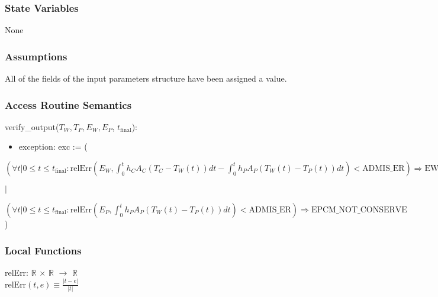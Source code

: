 \documentclass[12pt, titlepage]{article}
\begin{document}
\subsubsection{State Variables}

None

\subsubsection{Assumptions}

All of the fields of the input parameters structure have been assigned a
value.  

\subsubsection{Access Routine Semantics}

\noindent verify\_output($T_W, T_P, E_W, E_P$, $t_\text{final}$):
\begin{itemize}
\item exception: exc := (
\end{itemize}

\noindent $
(\forall t | 0 \leq t \leq t_\text{final} : \text{relErr}(E_W,
\int_{0}^{t} h_C A_C (T_C - T_W(t)) dt - \int_{0}^{t} h_P A_P (T_W(t)
- T_P(t)) dt) < \text{ADMIS\_ER}) \Rightarrow \text{EWAT\_NOT\_CONSERVE}
$

$|$

\noindent $ 
(\forall t | 0 \leq t \leq t_\text{final} : \text{relErr}(E_{P}, \int_{0}^{t}
h_{P} A_{P} (T_{W}(t) - T_{P}(t)) dt) < \text{ADMIS\_ER}) \Rightarrow
\text{EPCM\_NOT\_CONSERVE} 
$
)

\subsubsection{Local Functions}

relErr: $\mathbb{R}$ $\times$ $\mathbb{R}$ $\rightarrow$ $\mathbb{R}$ \\
$\text{relErr}(t, e) \equiv \frac{|t - e|}{|t|}$ \\
\newline
\end{document}
